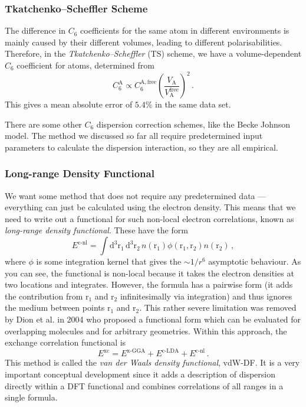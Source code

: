 \documentclass{article}
\theoremstyle{plain}\theoremheaderfont{\normalfont\itshape}\theorembodyfont{\rmfamily}\theoremseparator{.}\newtheorem*{rem}{Remark}\newtheorem*{ex}{Example}\newtheorem*{proof}{Proof}\newtheorem*{altp}{Alternative proof}
\theoremstyle{plain}\theoremheaderfont{\normalfont\bfseries}\theorembodyfont{\rmfamily}\theoremseparator{.}\newtheorem{thm}{Theorem}[section]\newtheorem{lem}[thm]{Lemma}\newtheorem{prop}[thm]{Proposition}\newtheorem*{cor}{Corollary}\newtheorem{defn}[thm]{Definition}\newtheorem{clm}[thm]{Claim}\newtheorem{clminproof}{Claim}\newtheorem{pos}{Postulate}[section]
\theoremstyle{break}\theoremheaderfont{\normalfont\itshape}\theorembodyfont{\rmfamily}\theoremseparator{.\medskip}\newtheorem*{proofskip}{Proof}\newtheorem*{exs}{Examples}\newtheorem*{rems}{Remarks}
\theoremstyle{break}\theoremheaderfont{\normalfont\bfseries}\theorembodyfont{\rmfamily}\theoremseparator{.\medskip}\newtheorem{lemskip}[thm]{Lemma}\newtheorem{defnskip}[thm]{Definition}\newtheorem{propskip}[thm]{Proposition}\newtheorem{thmskip}[thm]{Theorem}
\numberwithin{equation}{section}
\newcommand{\dd}[2][]{\mathrm{d}^{#1} #2\,}
\newcommand{\vb}[1]{\bm{\mathrm{#1}}}
\begin{document}
    \subsubsection*{Tkatchenko--Scheffler Scheme}
    The difference in \(C_6\) coefficients for the same atom in different environments is mainly caused by their different volumes, leading to different polarisabilities. Therefore, in the \textit{Tkatchenko--Scheffler} (TS) scheme, we have a volume-dependent \(C_6\) coefficient for atoms, determined from
    \begin{equation}
        C_6^{\mathrm{A}}\propto C_6^{\mathrm{A},\text{free}}\left(\frac{V_{\mathrm{A}}}{V_{\mathrm{A}}^{\text{free}}}\right)^2\,.
    \end{equation}
    This gives a mean absolute error of \(5.4\%\) in the same data set.

    There are some other \(C_6\) dispersion correction schemes, like the Becke Johnson model. The method we discussed so far all require predetermined input parameters to calculate the dispersion interaction, so they are all empirical.

    \subsubsection{Long-range Density Functional}
    We want some method that does not require any predetermined data --- everything can just be calculated using the electron density. This means that we need to write out a functional for such non-local electron correlations, known as \textit{long-range density functional}. These have the form
    \begin{equation}
        E^{\text{c-nl}}=\int\dd[3]{\vb{r}_1}\dd[3]{\vb{r}_2}n(\vb{r}_1)\phi(\vb{r}_1,\vb{r}_2)n(\vb{r}_2)\,,
    \end{equation}
    where \(\phi\) is some integration kernel that gives the \(\sim 1/r^6\) asymptotic behaviour. As you can see, the functional is non-local because it takes the electron densities at two locations and integrates. However, the formula has a pairwise form (it adds the contribution from \(\vb{r}_1\) and \(\vb{r}_2\) infinitesimally via integration) and thus ignores the medium between points \(\vb{r}_1\) and \(\vb{r_2}\). This rather severe limitation was removed by Dion et al. in 2004 who proposed a functional form which can be evaluated for overlapping molecules and for arbitrary geometries. Within this approach, the exchange correlation functional is
    \begin{equation}
        E^{\text{xc}}=E^{\text{x-GGA}}+E^{\text{c-LDA}}+E^{\text{c-nl}}\,.
    \end{equation}
    This method is called the \textit{van der Waals density functional}, vdW-DF. It is a very important conceptual development since it adds a description of dispersion directly within a DFT functional and combines correlations of all ranges in a single formula.
    
\end{document}
